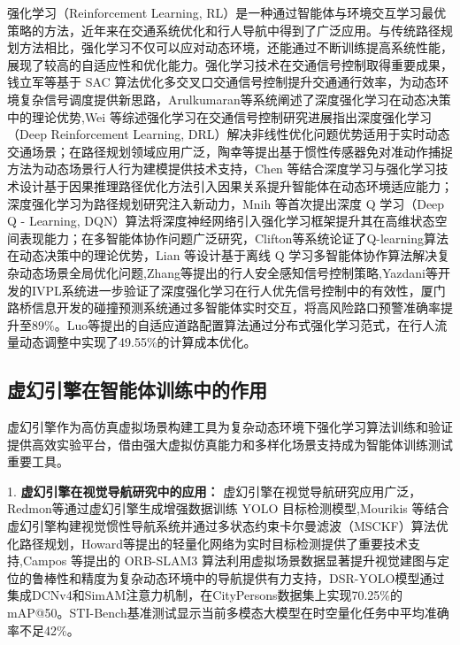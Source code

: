 强化学习（Reinforcement Learning, RL）是一种通过智能体与环境交互学习最优策略的方法，近年来在交通系统优化和行人导航中得到了广泛应用。与传统路径规划方法相比，强化学习不仅可以应对动态环境，还能通过不断训练提高系统性能，展现了较高的自适应性和优化能力。强化学习技术在交通信号控制取得重要成果，钱立军等\cite{qian2024sac}基于 SAC 算法优化多交叉口交通信号控制提升交通通行效率，为动态环境复杂信号调度提供新思路，Arulkumaran等\cite{arulkumaran2017deeprl}系统阐述了深度强化学习在动态决策中的理论优势,Wei 等\cite{wei2021survey}综述强化学习在交通信号控制研究进展指出深度强化学习（Deep Reinforcement Learning, DRL）解决非线性优化问题优势适用于实时动态交通场景；在路径规划领域应用广泛，陶幸等\cite{tao2024motion}提出基于惯性传感器免对准动作捕捉方法为动态场景行人行为建模提供技术支持，Chen 等\cite{chen2018ionet}结合深度学习与强化学习技术设计基于因果推理路径优化方法引入因果关系提升智能体在动态环境适应能力；深度强化学习为路径规划研究注入新动力，Mnih 等\cite{mnih2013dqn}首次提出深度 Q 学习（Deep Q - Learning, DQN）算法将深度神经网络引入强化学习框架提升其在高维状态空间表现能力；在多智能体协作问题广泛研究，Clifton等\cite{clifton2020qlearning}系统论证了Q-learning算法在动态决策中的理论优势，Lian 等\cite{lian2023inverseql}设计基于离线 Q 学习多智能体协作算法解决复杂动态场景全局优化问题,Zhang等\cite{zhang2019pedestrian}提出的行人安全感知信号控制策略,Yazdani等\cite{yazdani2023ivpl}开发的IVPL系统进一步验证了深度强化学习在行人优先信号控制中的有效性，厦门路桥信息\cite{xiamen2025}开发的碰撞预测系统通过多智能体实时交互，将高风险路口预警准确率提升至89\%。Luo等\cite{luo2023adaptive}提出的自适应道路配置算法通过分布式强化学习范式，在行人流量动态调整中实现了49.55\%的计算成本优化。

\subsection{虚幻引擎在智能体训练中的作用}

虚幻引擎作为高仿真虚拟场景构建工具为复杂动态环境下强化学习算法训练和验证提供高效实验平台，借由强大虚拟仿真能力和多样化场景支持成为智能体训练测试重要工具。

1. \textbf{虚幻引擎在视觉导航研究中的应用：} 虚幻引擎在视觉导航研究应用广泛，Redmon等\cite{redmon2017yolo9000}通过虚幻引擎生成增强数据训练 YOLO 目标检测模型,Mourikis 等\cite{mourikis2007msckf}结合虚幻引擎构建视觉惯性导航系统并通过多状态约束卡尔曼滤波（MSCKF）算法优化路径规划，Howard等\cite{howard2017mobilenets}提出的轻量化网络为实时目标检测提供了重要技术支持,Campos 等\cite{campos2021orbslam3}提出的 ORB-SLAM3 算法利用虚拟场景数据显著提升视觉建图与定位的鲁棒性和精度为复杂动态环境中的导航提供有力支持，DSR-YOLO模型\cite{dsryolo2025}通过集成DCNv4和SimAM注意力机制，在CityPersons数据集上实现70.25\%的mAP@50。STI-Bench基准测试\cite{sti2025}显示当前多模态大模型在时空量化任务中平均准确率不足42\%。


